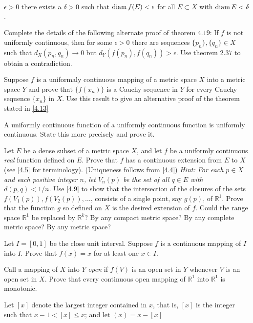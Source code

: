 \begin{exercise}
  \(\epsilon > 0\) there exists a \(\delta > 0\) such that
  \(\operatorname{diam} f(E) < \epsilon\) for all \(E\subset X\) with \(\operatorname{diam} E < \delta\).
\item
  Complete the details of the following alternate  proof of theorem \(4.19\):
  If \(f\) is not uniformly continuous, then for some \(\epsilon > 0\) there
  are sequences \(\{p_n\},\{q_n\}\in X\) such that \(d_X(p_n,q_n)\to 0\) but
  \(d_Y(f(p_n),f(q_n)) > \epsilon\).
  Use theorem \(2.37\) to obtain a contradiction.
\item
  Suppose \(f\) is a uniformaly continuous mapping of a metric space \(X\)
  into a metric space \(Y\) and prove that \(\{f(x_n)\}\) is a Cauchy sequence
  in \(Y\) for every Cauchy sequence \(\{x_n\}\) in \(X\).
  Use this result to give an alternative proof of the theorem stated in
  \cref{4.13}
\item
  A uniformly continuous function of a uniformly continuous function is
  uniformly continuous.
  State this more precisely and prove it.
\item
  \label{4.13}
  Let \(E\) be a dense subset of a metric space \(X\), and let \(f\) be a
  uniformly continuous \textit{real} function defined on \(E\).
  Prove that \(f\) has a continuous extension from \(E\) to \(X\)
  (see \cref{4.5} for terminology).
  (Uniqueness follows from \cref{4.4})
  \textit{Hint: For each \(p\in X\) and each positive integer \(n\), let
    \(V_n(p)\) be the set of all \(q\in E\) with \(d(p,q) < 1/n\).}
  Use \cref{4.9} to show that the intersection of the closures of the sets
  \(f(V_1(p)),f(V_2(p)),\ldots\), consists of a single point, say \(g(p)\), of
  \(\mathbb{R}^1\).
  Prove that the function \(g\) so defined on \(X\) is the desired extension
  of \(f\).
  Could the range space \(\mathbb{R}^1\) be replaced by \(\mathbb{R}^k\)?
  By any compact metric space?
  By any complete metric space?
  By any metric space?
\item
  Let \(I = [0,1]\) be the close unit interval.
  Suppose \(f\) is a continuous mapping of \(I\) into \(I\).
  Prove that \(f(x) = x\) for at least one \(x\in I\).
\item
  Call a mapping of \(X\) into \(Y\) \textit{open} if \(f(V)\) is an open set
  in \(Y\) whenever \(V\) is an open set in \(X\).
  Prove that every continuous open mapping of \(\mathbb{R}^1\) into
  \(\mathbb{R}^1\) is monotonic.
\item
  Let \([x]\) denote the largest integer contained in \(x\), that is, \([x]\)
  is the integer such that \(x - 1 < [x]\leq x\); and let \((x) = x - [x]\)

\end{exercise}
